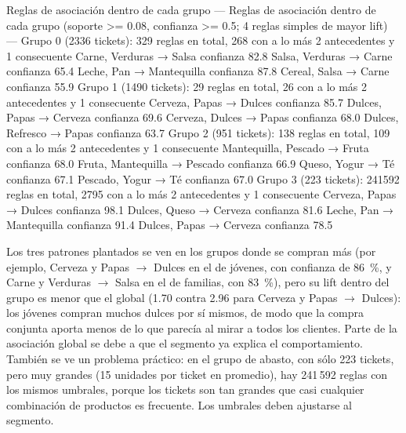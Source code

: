 \documentclass[11pt,letterpaper]{article}
\begin{document}
\begin{consola}[label=out:porgrupo]{Reglas de asociación dentro de cada grupo}
--- Reglas de asociación dentro de cada grupo (soporte >= 0.08, confianza >= 0.5; 4 reglas simples de mayor lift) ---
Grupo 0 (2336 tickets): 329 reglas en total, 268 con a lo más 2 antecedentes y 1 consecuente
    Carne, Verduras → Salsa   confianza 82.8%
    Salsa, Verduras → Carne   confianza 65.4%
    Leche, Pan → Mantequilla   confianza 87.8%
    Cereal, Salsa → Carne   confianza 55.9%
Grupo 1 (1490 tickets): 29 reglas en total, 26 con a lo más 2 antecedentes y 1 consecuente
    Cerveza, Papas → Dulces   confianza 85.7%
    Dulces, Papas → Cerveza   confianza 69.6%
    Cerveza, Dulces → Papas   confianza 68.0%
    Dulces, Refresco → Papas   confianza 63.7%
Grupo 2 (951 tickets): 138 reglas en total, 109 con a lo más 2 antecedentes y 1 consecuente
    Mantequilla, Pescado → Fruta   confianza 68.0%
    Fruta, Mantequilla → Pescado   confianza 66.9%
    Queso, Yogur → Té   confianza 67.1%
    Pescado, Yogur → Té   confianza 67.0%
Grupo 3 (223 tickets): 241592 reglas en total, 2795 con a lo más 2 antecedentes y 1 consecuente
    Cerveza, Papas → Dulces   confianza 98.1%
    Dulces, Queso → Cerveza   confianza 81.6%
    Leche, Pan → Mantequilla   confianza 91.4%
    Dulces, Papas → Cerveza   confianza 78.5%
\end{consola}

Los tres patrones plantados se ven en los grupos donde se compran más (por ejemplo, Cerveza y Papas $\rightarrow$ Dulces en el de jóvenes, con confianza de 86~\%, y Carne y Verduras $\rightarrow$ Salsa en el de familias, con 83~\%), pero su lift dentro del grupo es menor que el global (1.70 contra 2.96 para Cerveza y Papas $\rightarrow$ Dulces): los jóvenes compran muchos dulces por sí mismos, de modo que la compra conjunta aporta menos de lo que parecía al mirar a todos los clientes. Parte de la asociación global se debe a que el segmento ya explica el comportamiento. También se ve un problema práctico: en el grupo de abasto, con sólo 223 tickets, pero muy grandes (15 unidades por ticket en promedio), hay 241\,592 reglas con los mismos umbrales, porque los tickets son tan grandes que casi cualquier combinación de productos es frecuente. Los umbrales deben ajustarse al segmento.
\end{document}
